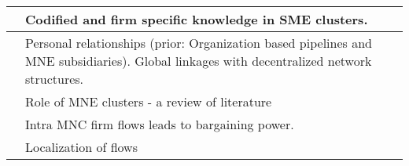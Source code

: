 \documentclass[12pt]{article}
\begin{document}
\begin{center}
\begin{longtable}{|p{}|p{}|p{}|}
\cite{Lissoni2001} & Codified and firm specific knowledge in SME clusters.&\\\hline

\cite{Lorenzen2013} & Personal relationships (prior: Organization based pipelines and MNE subsidiaries). Global linkages with decentralized network structures.&\\\hline

\cite{Mudambi2012} & Role of MNE clusters - a review of literature&\\\hline

\cite{Mudambi2004} & Intra MNC firm flows leads to bargaining power.&\\\hline

\cite{Murata2013} & Localization of flows&\\\hline
\end{longtable}
\end{center}


 

\end{document}
